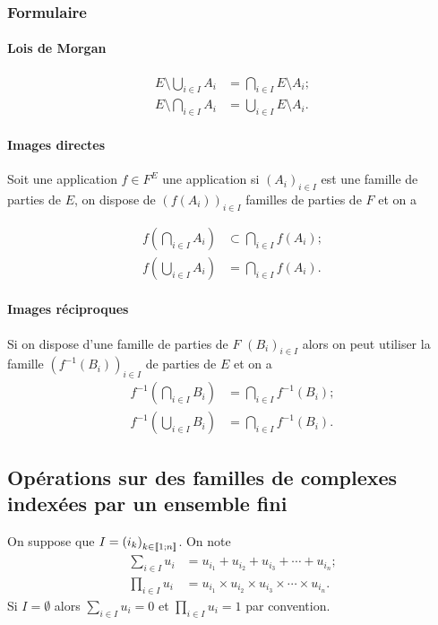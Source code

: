\subsubsection{Formulaire}\label{chap3-subsubsec:formulaireensemble}

\paragraph{Lois de Morgan}\label{chap3-par:morgan}
\begin{align}
  E \setminus \bigcup\limits_{i \in{}I} A_i &= \bigcap\limits_{i \in{}I} E
  \setminus A_i;\\
  E \setminus \bigcap\limits_{i \in{}I} A_i &= \bigcup\limits_{i \in{}I} E
  \setminus A_i.
\end{align}

\paragraph{Images directes}\label{chap3-par:imagedir}

Soit une application \(f \in{}F^E\) une application si \({(A_i)}_{i \in{}I}\) est
une famille de parties de \(E\), on dispose de \({(f(A_i))}_{i \in{}I}\) familles
de parties de \(F\) et on a

\begin{align}
  f \left(\bigcap\limits_{i \in{}I} A_i\right) &\subset{}\bigcap\limits_{i \in{}
  I} f(A_i);\\
    f \left(\bigcup\limits_{i \in{}I} A_i\right) &= \bigcap\limits_{i \in{}I}
    f(A_i).
\end{align}

\paragraph{Images réciproques}\label{chap3-par:imagerec}

Si on dispose d'une famille de parties de \(F\) \({(B_i)}_{i \in{}I}\) alors on
peut utiliser la famille \({(f^{-1}(B_i))}_{i \in{}I}\) de parties de \(E\) et on a
\begin{align}
  f^{-1} \left(\bigcap\limits_{i \in{}I} B_i\right) &= \bigcap\limits_{i \in{}I} f^{-1}(B_i);\\
  f^{-1} \left(\bigcup\limits_{i \in{}I} B_i\right) &= \bigcap\limits_{i \in{}I} f^{-1}(B_i).
\end{align}

\subsection{Opérations sur des familles de complexes indexées par un
ensemble fini}\label{chap3-subsec:operationsfamilles}
On suppose que \(I = {(i_k)}_{k\in{}\mathopen{\llbracket}1\mathclose{}\mathpunct{};n\mathclose{\rrbracket}}\). On note
\begin{align}
  \sum_{i \in{}I} u_i &= u_{i_1} +u_{i_2} +u_{i_3} + \dotsb +u_{i_n};\\
  \prod_{i \in{}I} u_i &= u_{i_1} \times u_{i_2} \times u_{i_3} \times \dotsm
  \times u_{i_n}.
\end{align}
Si \(I = \emptyset\) alors \(\sum_{i \in{}I} u_i = 0\) et \(\prod_{i \in{}I} u_i =
1\) par convention.

